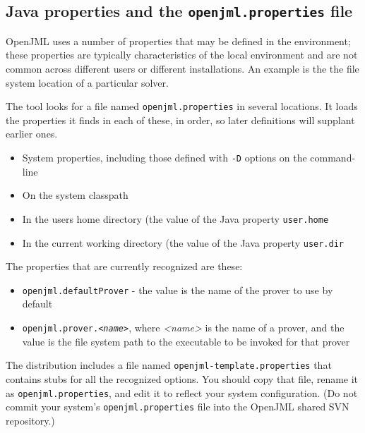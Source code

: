 \documentclass{report}%
\newcommand{\nospace}{\setlength{\itemsep}{0in}\setlength{\parsep}{0in}\setlength{\parskip}{0in}\setlength{\topsep}{0in}}
\begin{document}
\subsection{Java properties and the {\tt openjml.properties} file}

OpenJML uses a number of properties that may be defined in the environment; these properties are
typically characteristics of the local environment and are not common across different users or
different installations. An example is the the file system location of a particular solver.

The tool looks for a file named {\tt openjml.properties} in several locations. It loads the
properties it finds in each of these, in order, so later definitions will supplant earlier ones.
\begin{itemize}\nospace
\item System properties, including those defined with {\tt -D} options on the command-line
\item On the system classpath
\item In the users home directory (the value of the Java property {\tt user.home}
\item In the current working directory (the value of the Java property {\tt user.dir}
\end{itemize}

The properties that are currently recognized are these:
\begin{itemize}\nospace
\item {\tt openjml.defaultProver} - the value is the name of the prover to use by default
\item {\tt openjml.prover.{\it <name>}}, where {\it <name>} is the name of a prover, and
the value is the file system path to the executable to be invoked for that prover
\end{itemize}

The distribution includes a file named {\tt openjml-template.properties} that contains stubs for all the recognized options.
You should copy that file, rename it as {\tt openjml.properties}, and edit it to reflect your system configuration.
(Do not commit your system's {\tt openjml.properties} file into the OpenJML shared SVN repository.)
\end{document}
